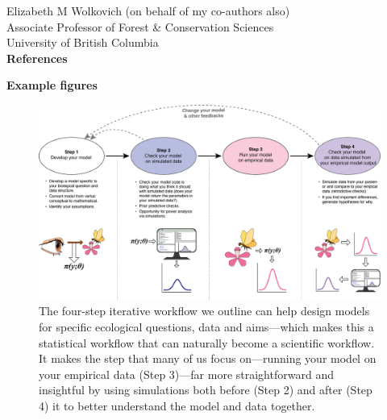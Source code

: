 \documentclass[11pt]{article}
\begin{document}
Elizabeth M Wolkovich (on behalf of my co-authors also)\\
Associate Professor of Forest \& Conservation Sciences\\ 
University of British Columbia\\

{\bf References}
\vspace{-8ex}


\newpage
{\bf Example figures}


\begin{figure}[ht]
\centering
\noindent \includegraphics[width=1\textwidth]{..//figures/workflow.png}
\caption{The four-step iterative workflow we outline can help design models for specific ecological questions, data and aims---which makes this a statistical workflow that can naturally become a scientific workflow. It makes the step that many of us focus on---running your model on your empirical data (Step 3)---far more straightforward and insightful by using simulations both before (Step 2) and after (Step 4) it to better understand the model and data together.}
\label{fig:workflow}
\end{figure}
\end{document}
